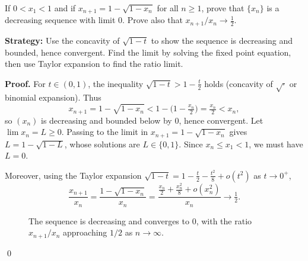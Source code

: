 \begin{problembox}
If $0 < x_1 < 1$ and if $x_{n+1} = 1 - \sqrt{1 - x_n}$ for all $n \geq 1$, prove that $\{x_n\}$ is a decreasing sequence with limit 0. Prove also that $x_{n+1}/x_n \to \frac{1}{2}$.
\end{problembox}

\noindent\textbf{Strategy:} Use the concavity of $\sqrt{1-t}$ to show the sequence is decreasing and bounded, hence convergent. Find the limit by solving the fixed point equation, then use Taylor expansion to find the ratio limit.

\noindent\textbf{Proof.}
For $t\in(0,1)$, the inequality $\sqrt{1-t}>1-\tfrac{t}{2}$ holds (concavity of $\sqrt{\cdot}$ or binomial expansion). Thus
\[
x_{n+1}=1-\sqrt{1-x_n}<1-\Big(1-\tfrac{x_n}{2}\Big)=\tfrac{x_n}{2}<x_n,
\]
so $(x_n)$ is decreasing and bounded below by $0$, hence convergent. Let $\lim x_n=L\ge 0$. Passing to the limit in $x_{n+1}=1-\sqrt{1-x_n}$ gives $L=1-\sqrt{1-L}$, whose solutions are $L\in\{0,1\}$. Since $x_n\le x_1<1$, we must have $L=0$.

Moreover, using the Taylor expansion $\sqrt{1-t}=1-\tfrac{t}{2}-\tfrac{t^2}{8}+o(t^2)$ as $t\to 0^+$,
\[
\frac{x_{n+1}}{x_n}=\frac{1-\sqrt{1-x_n}}{x_n}=\frac{\tfrac{x_n}{2}+\tfrac{x_n^2}{8}+o(x_n^2)}{x_n}\to \tfrac12.
\]

\begin{figure}[h]
\centering
{}
\caption{The sequence is decreasing and converges to 0, with the ratio $x_{n+1}/x_n$ approaching $1/2$ as $n \to \infty$.}
\end{figure}\qed
\medskip



